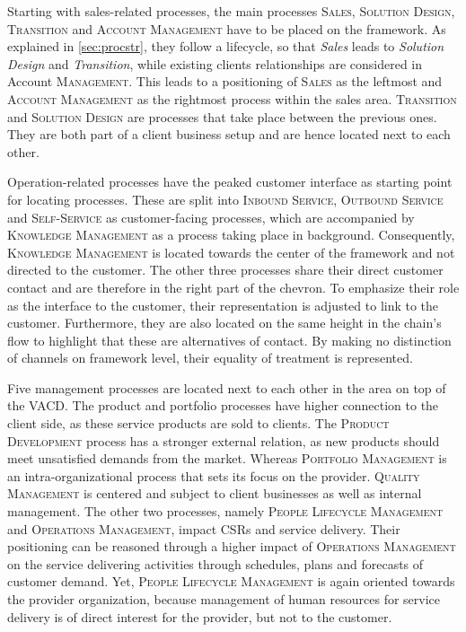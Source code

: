	
	 Starting with sales-related processes, the main processes \textsc{Sales}, \textsc{Solution Design}, \textsc{Transition} and \textsc{Account Management} have to be placed on the framework. As explained in \ref{sec:procstr}, they follow a lifecycle, so that \textit{Sales} leads to \textit{Solution Design} and \textit{Transition}, while existing clients relationships are considered in Account \textsc{Management}. This leads to a positioning of \textsc{Sales} as the leftmost and \textsc{Account Management} as the rightmost process within the sales area. \textsc{Transition} and \textsc{Solution Design} are processes that take place between the previous ones. They are both part of a client business setup and are hence located next to each other.
	 
	 Operation-related processes have the peaked customer interface as starting point for locating processes. These are split into \textsc{Inbound Service}, \textsc{Outbound Service} and \textsc{Self-Service} as customer-facing processes, which are accompanied by \textsc{Knowledge Management} as a process taking place in background. Consequently, \textsc{Knowledge Management} is located towards the center of the framework and not directed to the customer. The other three processes share their direct customer contact and are therefore in the right part of the chevron. To emphasize their role as the interface to the customer, their representation is adjusted to link to the customer. Furthermore, they are also located on the same height in the chain's flow to highlight that these are alternatives of contact. By making no distinction of channels on framework level, their equality of treatment is represented. 
	 
	 Five management processes are located next to each other in the area on top of the \acrshort{VACD}. The product and portfolio processes have higher connection to the client side, as these service products are sold to clients. The \textsc{Product Development} process has a stronger external relation, as new products should meet unsatisfied demands from the market. Whereas \textsc{Portfolio Management} is an intra-organizational process that sets its focus on the provider. \textsc{Quality Management} is centered and subject to client businesses as well as internal management. The other two processes, namely \textsc{People Lifecycle Management} and \textsc{Operations Management}, impact \acrshort{CSR}s and service delivery. Their positioning can be reasoned through a higher impact of \textsc{Operations Management} on the service delivering activities through schedules, plans and forecasts of customer demand. Yet, \textsc{People Lifecycle Management} is again oriented towards the provider organization, because management of human resources for service delivery is of direct interest for the provider, but not to the customer.
	 
